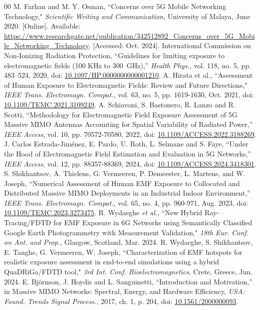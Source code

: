\documentclass{IEEEtran}
\newcommand*{\doi}[1]{\href{http://dx.doi.org/#1}{#1}}
\begin{document}
\begin{thebibliography}{00}
 M. Farhan and M. Y. Osman, ``Concerns over 5G Mobile Networking Technology," \textit{Scientific Writing and Communication}, University of Malaya, June 2020. [Online]. Available: \url{https://www.researchgate.net/publication/342512892_Concerns_over_5G_Mobile_Networking_Technology}. [Accessed: Oct. 2024].
 International Commission on Non-Ionizing Radiation Protection, ``Guidelines for limiting exposure to electromagnetic fields (100 KHz to 300~GHz),'' \textit{Health Phys.}, vol. 118, no. 5, pp. 483–524, 2020, doi: \doi{10.1097/HP.0000000000001210}.
 A. Hirata et al., ``Assessment of Human Exposure to Electromagnetic Fields: Review and Future Directions," \textit{IEEE Trans. Electromagn. Compat.}, vol. 63, no. 5, pp. 1619-1630, Oct. 2021, doi: \doi{10.1109/TEMC.2021.3109249}.
 A. Schiavoni, S. Bastonero, R. Lanzo and R. Scotti, ``Methodology for Electromagnetic Field Exposure Assessment of 5G Massive MIMO Antennas Accounting for Spatial Variability of Radiated Power,'' \textit{IEEE Access}, vol. 10, pp. 70572-70580, 2022, doi: \doi{10.1109/ACCESS.2022.3188269}.
 J. Carlos Estrada-Jiménez, E. Pardo, U. Roth, L. Selmane and S. Faye, ``Under the Hood of Electromagnetic Field Estimation and Evaluation in 5G Networks,'' \textit{IEEE Access}, vol. 12, pp. 88357-88369, 2024, doi: \doi{10.1109/ACCESS.2024.3418301}.
 S. Shikhantsov, A. Thielens, G. Vermeeren, P. Demeester, L. Martens, and W. Joseph, ``Numerical Assessment of Human EMF Exposure to Collocated and Distributed Massive MIMO Deployments in an Industrial Indoor Environment,'' \textit{IEEE Trans. Electromagn. Compat.}, vol. 65, no. 4, pp. 960-971, Aug. 2023, doi: \doi{10.1109/TEMC.2023.3273475}.
 R. Wydaeghe \textit{et al.}, ``New Hybrid Ray-Tracing/FDTD for EMF Exposure in 6G Networks using Semantically Classified Google Earth Photogrammetry with Measurement Validation," \textit{18th Eur. Conf. on Ant. and Prop.}, Glasgow, Scotland, Mar. 2024.
 R. Wydaeghe, S. Shikhantsov, E. Tanghe, G. Vermeeren, W. Joseph, ``Characterization of EMF hotspots for realistic exposure assessment in end-to-end simulations using a hybrid QuaDRiGa/FDTD tool," \textit{3rd Int. Conf. Bioelectromagnetics}, Crete, Greece, Jun. 2024.
 E. Björnson, J. Hoydis and L. Sanguinetti, ``Introduction and Motivation,”
in Massive MIMO Networks: Spectral, Energy, and Hardware Efficiency, \textit{USA: Found. Trends Signal Process.}, 2017, ch. 1, p. 204, doi: \doi{10.1561/2000000093}.

\end{thebibliography}
\end{document}
